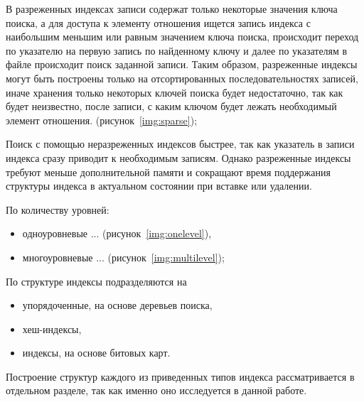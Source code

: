 В разреженных индексах записи содержат только некоторые значения ключа поиска, а
для доступа к элементу отношения ищется запись индекса с наибольшим меньшим или
равным значением ключа поиска, происходит переход по указателю на первую запись
по найденному ключу и далее по указателям в файле происходит поиск заданной
записи. Таким образом, разреженные индексы могут быть построены только на
отсортированных последовательностях записей, иначе хранения только некоторых
ключей поиска будет недостаточно, так как будет неизвестно, после записи, с
каким ключом будет лежать необходимый элемент отношения.
(рисунок~\ref{img:sparse});


Поиск с помощью неразреженных индексов быстрее, так как указатель в записи
индекса сразу приводит к необходимым записям. Однако разреженные индексы требуют
меньше дополнительной памяти и сокращают время поддержания структуры индекса в
актуальном состоянии при вставке или удалении.

По количеству уровней:
\begin{itemize}
    \item одноуровневые ... (рисунок~\ref{img:onelevel}),
    \item многоуровневые ... (рисунок~\ref{img:multilevel});
\end{itemize}

По структуре индексы подразделяются на
\begin{itemize}
    \item упорядоченные, на основе деревьев поиска,
    \item хеш-индексы,
    \item индексы, на основе битовых карт.
\end{itemize}

Построение структур каждого из приведенных типов индекса рассматривается в
отдельном разделе, так как именно оно исследуется в данной работе.

